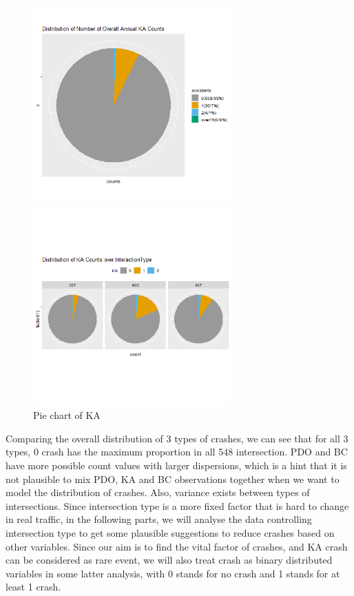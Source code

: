 \documentclass[11pt]{scrartcl} %
\begin{document}
\begin{figure}[H]
\begin{minipage}[t]{0.5\linewidth}
\centering
\includegraphics[width=3in]{image/p112.png}
\small
\end{minipage}
\begin{minipage}[t]{0.5\linewidth}
\centering
\includegraphics[width=3in]{image/p121_KA.png}
\small
\end{minipage}
\caption{Pie chart of KA}
\end{figure}

Comparing the overall distribution of 3 types of crashes, we can see that for all 3 types, 0 crash has the maximum proportion in all 548 intersection. PDO and BC have more possible count values with larger dispersions, which is a hint that it is not plausible to mix PDO, KA and BC observations together when we want to model the distribution of crashes. Also, variance exists between types of intersections. Since intersection type is a more fixed factor that is hard to change in real traffic, in the following parts, we will analyse the data controlling intersection type to get some plausible suggestions to reduce crashes based on other variables. Since our aim is to find the vital factor of crashes, and KA crash can be considered as rare event, we will also treat crash as binary distributed variables in some latter analysis, with 0 stands for no crash and 1 stands for at least 1 crash.
\end{document}
